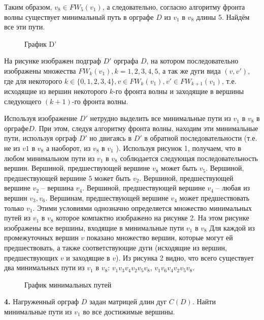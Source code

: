 \documentclass[12pt, letterpaper, titlepage]{article}
\begin{document}
Таким образом, $v_8 \in FW_5(v_1)$, а следовательно, согласно алгоритму фронта волны существует минимальный
путь в орграфе $D$ из $v_1$ в $v_8$ длины 5. Найдём все эти пути.
\begin{figure}[H]\centering\caption{График D'}\end{figure}
На рисунке изображен подграф $D'$ орграфа $D$, на котором последовательно изображены множества
$FW_k(v_1), k=1,2,3,4,5$, а так же  дуги вида $(v, v')$, где для некоторого $k \in \{0,1,2,3,4\},
    v \in FW_k(v_1), v' \in FW_{k+1}(v_1)$, т.е. исходящие из вершин некоторого $k$-го фронта волны и
заходящие в вершины следующего $(k+1)$-го фронта волны.

Используя изображение $D'$ нетрудно выделить все минимальные пути из $v_1$ в $v_8$
в орграфе$D$. При этом, следуя алгоритму фронта волны, находим эти минимальные пути, используя орграф $D'$
но двигаясь в $D'$ в обратной последовательности (т.е. не из $v1$ в $v_8$ а наоборот, из $v_8$
в $v_1$ ). Используя рисунок 1, получаем, что в любом минимальном пути из $v_1$ в $v_8$
соблюдается следующая последовательность вершин. Вершиной, предшествующей
вершине $v_8$ может быть $v_5$. Вершиной, предшествующей вершине $5$
может быть $v_2$. Вершиной, предшествующей вершине $v_2$ – вершина $v_4$.
Вершиной, предшествующей вершине $v_4$ – любая из вершин $v_3,v_6$.
Вершинам, предшествующей вершине $v_4$ может предшествовать только $v_1$. Этими условиями однозначно определяется множество
минимальных путей из $v_1$ в $v_8$ которое компактно изображено на рисунке 2. На этом
рисунке изображены все вершины, входящие в минимальные пути $v_1$ в $v_8$ Для каждой
из промежуточных вершин $v$ показано множество вершин, которые могут ей
предшествовать, а также соответствующие дуги (исходящие из вершин, предшествующих $v$
и заходящие в $v$). Из рисунка 2 видно, что всего существует два минимальных пути из $v_1$ в
$v_8$: $v_1v_3v_4v_2v_5v_8$, $v_1v_6v_4v_2v_5v_8$.
\begin{figure}[H]\centering\caption{График минимальных путей}\end{figure}
\textbf{4.} Нагруженный орграф $D$ задан матрицей длин дуг $C(D)$. Найти минимальные пути из $v_1$ во все достижимые вершины.
\end{document}
